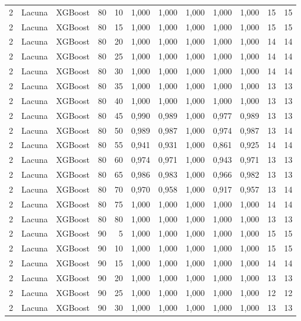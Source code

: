 \begin{longtable}{@{}rllrrrrrrrrr@{}}
2 & Lacuna & XGBoost & 80 & 10 & 1,000 & 1,000 & 1,000 & 1,000 & 1,000 & 15 & 15 \\
2 & Lacuna & XGBoost & 80 & 15 & 1,000 & 1,000 & 1,000 & 1,000 & 1,000 & 15 & 15 \\
2 & Lacuna & XGBoost & 80 & 20 & 1,000 & 1,000 & 1,000 & 1,000 & 1,000 & 14 & 14 \\
2 & Lacuna & XGBoost & 80 & 25 & 1,000 & 1,000 & 1,000 & 1,000 & 1,000 & 14 & 14 \\
2 & Lacuna & XGBoost & 80 & 30 & 1,000 & 1,000 & 1,000 & 1,000 & 1,000 & 14 & 14 \\
2 & Lacuna & XGBoost & 80 & 35 & 1,000 & 1,000 & 1,000 & 1,000 & 1,000 & 13 & 13 \\
2 & Lacuna & XGBoost & 80 & 40 & 1,000 & 1,000 & 1,000 & 1,000 & 1,000 & 13 & 13 \\
2 & Lacuna & XGBoost & 80 & 45 & 0,990 & 0,989 & 1,000 & 0,977 & 0,989 & 13 & 13 \\
2 & Lacuna & XGBoost & 80 & 50 & 0,989 & 0,987 & 1,000 & 0,974 & 0,987 & 13 & 14 \\
2 & Lacuna & XGBoost & 80 & 55 & 0,941 & 0,931 & 1,000 & 0,861 & 0,925 & 14 & 14 \\
2 & Lacuna & XGBoost & 80 & 60 & 0,974 & 0,971 & 1,000 & 0,943 & 0,971 & 13 & 13 \\
2 & Lacuna & XGBoost & 80 & 65 & 0,986 & 0,983 & 1,000 & 0,966 & 0,982 & 13 & 13 \\
2 & Lacuna & XGBoost & 80 & 70 & 0,970 & 0,958 & 1,000 & 0,917 & 0,957 & 13 & 14 \\
2 & Lacuna & XGBoost & 80 & 75 & 1,000 & 1,000 & 1,000 & 1,000 & 1,000 & 14 & 14 \\
2 & Lacuna & XGBoost & 80 & 80 & 1,000 & 1,000 & 1,000 & 1,000 & 1,000 & 13 & 13 \\
2 & Lacuna & XGBoost & 90 & 5 & 1,000 & 1,000 & 1,000 & 1,000 & 1,000 & 15 & 15 \\
2 & Lacuna & XGBoost & 90 & 10 & 1,000 & 1,000 & 1,000 & 1,000 & 1,000 & 15 & 15 \\
2 & Lacuna & XGBoost & 90 & 15 & 1,000 & 1,000 & 1,000 & 1,000 & 1,000 & 14 & 14 \\
2 & Lacuna & XGBoost & 90 & 20 & 1,000 & 1,000 & 1,000 & 1,000 & 1,000 & 13 & 13 \\
2 & Lacuna & XGBoost & 90 & 25 & 1,000 & 1,000 & 1,000 & 1,000 & 1,000 & 12 & 12 \\
2 & Lacuna & XGBoost & 90 & 30 & 1,000 & 1,000 & 1,000 & 1,000 & 1,000 & 13 & 13 \\

\end{longtable}
